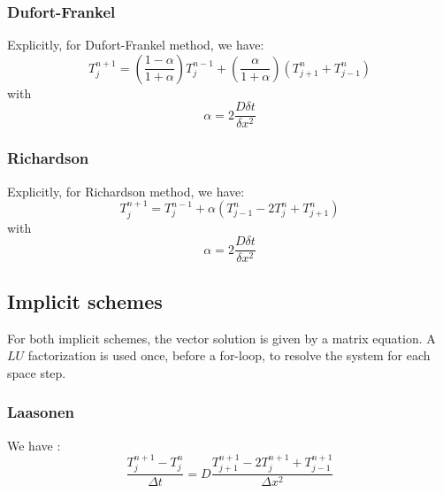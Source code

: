 \documentclass{article}
\begin{document}
            \subsubsection{Dufort-Frankel}
                Explicitly, for Dufort-Frankel method, we have:
                \begin{equation}
                    \label{eq:df}
                    T_{j}^{n+1} = (\frac{1-\alpha}{1+\alpha})T_{j}^{n-1} + (\frac{\alpha}{1+\alpha})(T_{j+1}^{n}+T_{j-1}^{n})
                \end{equation}
                with $$\alpha = 2\frac{D\delta t}{\delta x^{2}}$$

            \subsubsection{Richardson}
                Explicitly, for Richardson method, we have:
                \begin{equation}
                    \label{eq:rich}
                    T_{j}^{n+1} = T_{j}^{n-1} + \alpha (T_{j-1}^{n} - 2T_{j}^{n} + T_{j+1}^{n})
                \end{equation}
                with $$\alpha = 2\frac{D\delta t}{\delta x^{2}}$$

        \subsection{Implicit schemes}

                For both implicit schemes, the vector solution is given by a matrix equation. A $LU$
                factorization is used once, before a for-loop, to resolve the system for each space step.

                \subsubsection{Laasonen}

                We have :
                \begin{equation}
                    \frac{T_{j}^{n+1} - T_{j}^n}{\Delta t} = D \frac{T_{j+1}^{n+1}- 2T_{j}^{n+1} + T_{j-1}^{n+1}}{\Delta x^2}
                \end{equation}
\end{document}
